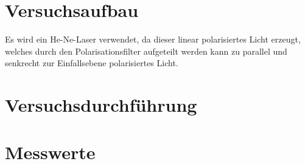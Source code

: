 


\section{Versuchsaufbau}

Es wird ein He-Ne-Laser verwendet, da dieser linear polarisiertes Licht erzeugt, welches durch den Polarisationsfilter aufgeteilt werden kann 
zu parallel und senkrecht zur Einfallsebene polarisiertes Licht. 


\section{Versuchsdurchführung}

\section{Messwerte}



